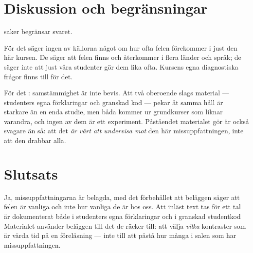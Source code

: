 \section{Diskussion och begränsningar}
\label{sec:input-diskussion}

 saker begränsar svaret.

%
För det  säger ingen av källorna något om
hur ofta felen
förekommer i just den här kursen.  De säger att felen finns och
återkommer i flera länder och språk; de säger inte att just våra
studenter gör dem lika ofta.  Kursens egna diagnostiska frågor finns
till för det.

För det : samstämmighet är inte bevis.
Att två oberoende slags
material --- studenters egna förklaringar och granskad kod --- pekar åt
samma håll är starkare än en enda studie, men båda kommer ur
grundkurser som liknar varandra, och ingen av dem är ett experiment.
Påståendet materialet gör är också svagare än så: att det \emph{är värt
att undervisa mot} den här missuppfattningen, inte att den drabbar alla.

\section{Slutsats}
\label{sec:input-slutsats}

Ja, missuppfattningarna är belagda, med det förbehållet att beläggen
säger att felen är vanliga och inte hur vanliga de är hos oss.  Att
inläst text tas för ett tal är dokumenterat både i studenters egna
förklaringar\autocite{GuoMarkelZhang2020} och i granskad
studentkod\autocite{Bosse2021Antipatterns}
Materialet använder beläggen till det de räcker till: att välja
\emph{vilka} kontraster som är värda tid på en föreläsning --- inte till
att påstå hur många i salen som har missuppfattningen.


